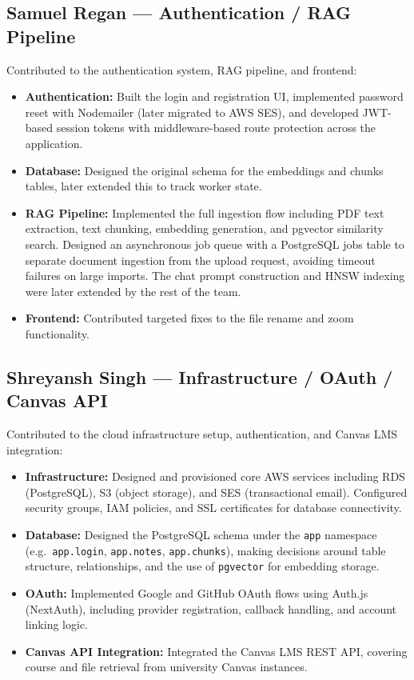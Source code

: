 \documentclass[12pt,a4paper]{article}
\newcommand{\tech}[1]{\texttt{#1}}
\begin{document}
\subsection{Samuel Regan --- Authentication / RAG Pipeline}
Contributed to the authentication system, RAG pipeline, and frontend:
\begin{itemize}[leftmargin=1.5em]
    \item \textbf{Authentication:} Built the login and registration UI, implemented password reset with Nodemailer (later migrated to AWS SES), and developed JWT-based session tokens with middleware-based route protection across the application.
    \item \textbf{Database:} Designed the original schema for the embeddings and chunks tables, later extended this to track worker state.
    \item \textbf{RAG Pipeline:} Implemented the full ingestion flow including PDF text extraction, text chunking, embedding generation, and pgvector similarity search. Designed an asynchronous job queue with a PostgreSQL jobs table to separate document ingestion from the upload request, avoiding timeout failures on large imports. The chat prompt construction and HNSW indexing were later extended by the rest of the team.
    \item \textbf{Frontend:} Contributed targeted fixes to the file rename and zoom functionality.
\end{itemize}

\subsection{Shreyansh Singh --- Infrastructure / OAuth / Canvas API}

Contributed to the cloud infrastructure setup, authentication, and Canvas LMS integration:

\begin{itemize}[leftmargin=1.5em]
    \item \textbf{Infrastructure:} Designed and provisioned core AWS services including RDS (PostgreSQL), S3 (object storage), and SES (transactional email). Configured security groups, IAM policies, and SSL certificates for database connectivity.
    \item \textbf{Database:} Designed the PostgreSQL schema under the \tech{app} namespace (e.g.\ \tech{app.login}, \tech{app.notes}, \tech{app.chunks}), making decisions around table structure, relationships, and the use of \tech{pgvector} for embedding storage.
    \item \textbf{OAuth:} Implemented Google and GitHub OAuth flows using Auth.js (NextAuth), including provider registration, callback handling, and account linking logic.
    \item \textbf{Canvas API Integration:} Integrated the Canvas LMS REST API, covering course and file retrieval from university Canvas instances.
\end{itemize}
\end{document}
